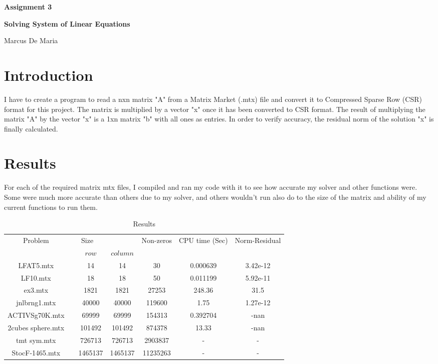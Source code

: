 \documentclass[12pt]{article}
\begin{document}
	
	\justifying
	
	\begin{center}
		\textbf{{\large Assignment 3}}
		
		\textbf{Solving System of Linear Equations} 
		
		Marcus De Maria
	\end{center}
	

	
	\section{Introduction}
    I have to create a program to read a nxn matrix "A" from a Matrix Market (.mtx) file and convert it to Compressed Sparse Row (CSR) format for this project. The matrix is multiplied by a vector "x" once it has been converted to CSR format. The result of multiplying the matrix "A" by the vector "x" is a 1xn matrix "b" with all ones as entries. In order to verify accuracy, the residual norm of the solution "x" is finally calculated.
	
	\section{Results}

For each of the required matrix mtx files, I compiled and ran my code with it to see how accurate my solver and other functions were. Some were much more accurate than others due to my solver, and others wouldn't run also do to the size of the matrix and ability of my current functions to run them.

	\begin{table}[h!]
		\caption{Results }
		\label{table:1}
		\centering
		\begin{tabular}{c c c c c c c}
			\hline
			Problem & \multicolumn{2}{c}{Size} & &Non-zeros & CPU time (Sec) & Norm-Residual\\
			& & $row$ & $column$ & \\
			\hline
			LFAT5.mtx   &   & 14 &14  &30  &0.000639 &3.42e-12\\
			LF10.mtx &   &18  &18 &50 &0.011199& 5.92e-11\\
			ex3.mtx & &1821  &1821  &27253 &248.36& 31.5\\
			jnlbrng1.mtx  &  &40000  &40000  &119600 &1.75 &1.27e-12\\
			ACTIVSg70K.mtx  &  &69999   &69999   &154313 &0.392704& -nan\\
			2cubes sphere.mtx &  &101492   &101492   &874378 &13.33 &-nan\\
			tmt sym.mtx& &726713  &726713   &2903837 &-&-\\
			StocF-1465.mtx & &1465137  &1465137   &11235263 &-&-\\
			\hline
		\end{tabular}
	\end{table}
\end{document}

